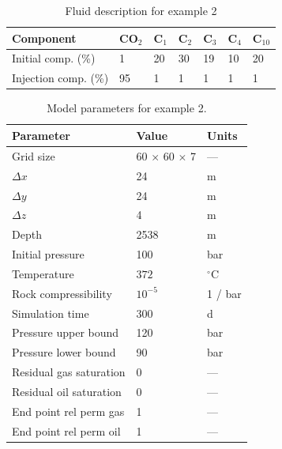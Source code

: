 \begin{table}
\tabcolsep=0pt
\centering
\caption{Fluid description for example 2}
\begin{tabular*}{84mm}{@{\extracolsep\fill}lllllll}\toprule
Component            & CO$_2$ & C$_1$ & C$_2$ & C$_3$ & C$_4$  & C$_{10}$ \\[2pt]
\midrule
Initial comp. (\%)   & 1    & 20  & 30  & 19  & 10   & 20     \\
Injection comp. (\%) & 95   &  1  &  1  &  1  &  1   &  1     \\
\bottomrule
\end{tabular*}
\label{table:VanEssenModelFluid}
\end{table}


\begin{table}
\tabcolsep=0pt
\centering
\caption{Model parameters for example 2.}
\label{table:VanEssenModelReservoir}
\begin{tabular*}{84mm}{@{\extracolsep\fill}lll}\toprule
Parameter                      & Value           & Units     \\
\midrule
Grid size                      & 60 $\times$ 60 $\times$ 7 &  ---      \\
$\Delta x$                     & 24           & m            \\
$\Delta y$                     & 24           & m            \\
$\Delta z$                     &  4           & m            \\
Depth                          & 2538       & m              \\
Initial pressure               & 100          & bar          \\
Temperature                    & $372$     & $^\circ$C       \\
Rock compressibility           & $10^{-5}$    & 1 / bar      \\
Simulation time                & 300          & d            \\
Pressure upper bound           & 120          & bar          \\
Pressure lower bound           &  90          & bar          \\
Residual gas saturation  & 0 & ---                           \\
Residual oil saturation  & 0 & ---                           \\
End point rel perm gas   & 1 & ---                           \\
End point rel perm oil   & 1 & ---                           \\

\end{tabular*}
\end{table}
